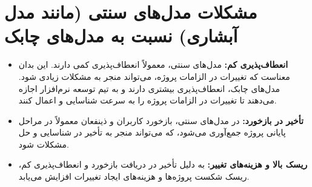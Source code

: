 \section*{ مشکلات مدل‌های سنتی (مانند مدل آبشاری) نسبت به مدل‌های چابک}
\begin{itemize}
	\item \textbf{انعطاف‌پذیری کم:}
	مدل‌های سنتی، معمولاً انعطاف‌پذیری کمی دارند. این بدان معناست که تغییرات در الزامات پروژه، می‌تواند منجر به مشکلات زیادی شود. مدل‌های چابک، انعطاف‌پذیری بیشتری دارند و به تیم توسعه نرم‌افزار اجازه می‌دهند تا تغییرات در الزامات پروژه را به سرعت شناسایی و اعمال کنند.
	
	\item \textbf{تأخیر در بازخورد:}
	در مدل‌های سنتی، بازخورد کاربران و ذینفعان معمولاً در مراحل پایانی پروژه جمع‌آوری می‌شود، که می‌تواند منجر به تأخیر در شناسایی و حل مشکلات شود.
	\item \textbf{ریسک بالا و هزینه‌های تغییر:}
	به دلیل تأخیر در دریافت بازخورد و انعطاف‌پذیری کم، ریسک شکست پروژه‌ها و هزینه‌های ایجاد تغییرات افزایش می‌یابد.
\end{itemize}